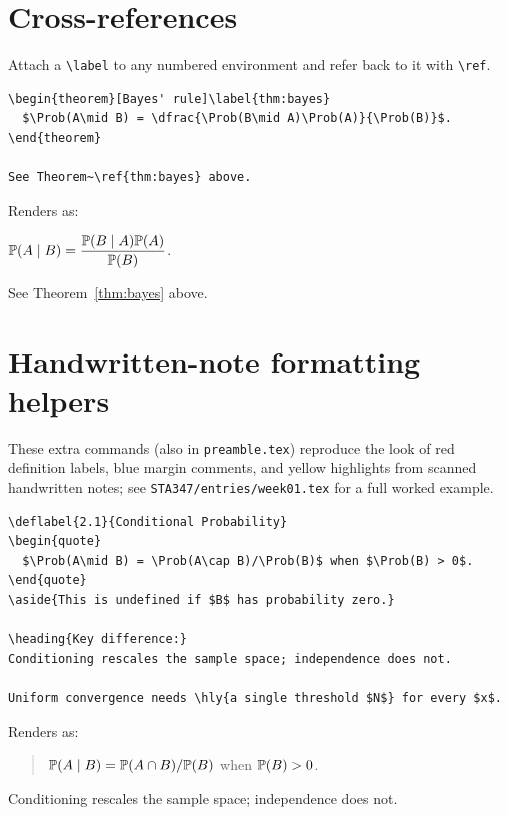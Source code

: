 \documentclass[11pt,letterpaper]{article}
\begin{document}
\section{Cross-references}
Attach a \texttt{\textbackslash label} to any numbered environment and refer
back to it with \texttt{\textbackslash ref}.

\begin{verbatim}
\begin{theorem}[Bayes' rule]\label{thm:bayes}
  $\Prob(A\mid B) = \dfrac{\Prob(B\mid A)\Prob(A)}{\Prob(B)}$.
\end{theorem}

See Theorem~\ref{thm:bayes} above.
\end{verbatim}
Renders as:
\begin{theorem}\label{thm:bayes}
  $\mathbb{P}(A\mid B) = \dfrac{\mathbb{P}(B\mid A)\mathbb{P}(A)}{\mathbb{P}(B)}$.
\end{theorem}
See Theorem~\ref{thm:bayes} above.

\section{Handwritten-note formatting helpers}
These extra commands (also in \texttt{preamble.tex}) reproduce the look of
red definition labels, blue margin comments, and yellow highlights from
scanned handwritten notes; see \texttt{STA347/entries/week01.tex} for a full
worked example.

\begin{verbatim}
\deflabel{2.1}{Conditional Probability}
\begin{quote}
  $\Prob(A\mid B) = \Prob(A\cap B)/\Prob(B)$ when $\Prob(B) > 0$.
\end{quote}
\aside{This is undefined if $B$ has probability zero.}

\heading{Key difference:}
Conditioning rescales the sample space; independence does not.

Uniform convergence needs \hly{a single threshold $N$} for every $x$.
\end{verbatim}
Renders as:

\begin{quote}
  $\mathbb{P}(A\mid B) = \mathbb{P}(A\cap B)/\mathbb{P}(B)$ when $\mathbb{P}(B) > 0$.
\end{quote}

Conditioning rescales the sample space; independence does not.
\end{document}
